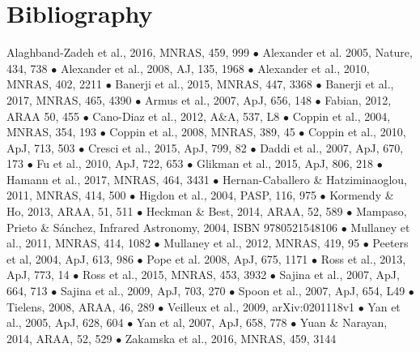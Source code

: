 \footnotesize
\section*{Bibliography}
\vspace{-8pt}
Alaghband-Zadeh et al., 2016, MNRAS, 459, 999 $\bullet$
Alexander et al. 2005, Nature, 434, 738  $\bullet$
Alexander et al., 2008, AJ, 135, 1968	 $\bullet$
Alexander et al., 2010, MNRAS, 402, 2211 $\bullet$
Banerji et al., 2015, MNRAS, 447, 3368 $\bullet$
Banerji et al., 2017, MNRAS, 465, 4390 $\bullet$
Armus et al., 2007, ApJ, 656, 148 $\bullet$
Fabian, 2012, ARAA 50, 455 $\bullet$ 
Cano-Diaz et al., 2012, A\&A, 537, L8 $\bullet$  
Coppin et al., 2004, MNRAS, 354, 193 $\bullet$
Coppin et al., 2008, MNRAS, 389, 45 $\bullet$
Coppin et al., 2010, ApJ, 713, 503 $\bullet$
Cresci et al., 2015, ApJ, 799, 82 $\bullet$
Daddi et al., 2007, ApJ, 670, 173	$\bullet$
Fu et al., 2010, ApJ, 722, 653 	$\bullet$
Glikman et al., 2015, ApJ, 806, 218 $\bullet$
Hamann et al., 2017, MNRAS, 464, 3431 $\bullet$
Hernan-Caballero \& Hatziminaoglou, 2011, MNRAS, 414, 500	$\bullet$
Higdon et al., 2004, PASP, 116, 975 $\bullet$
Kormendy \& Ho, 2013, ARAA, 51, 511 $\bullet$
Heckman \& Best, 2014, ARAA, 52, 589  $\bullet$
Mampaso, Prieto \& Sánchez, Infrared Astronomy, 2004, ISBN  9780521548106 $\bullet$
Mullaney et al., 2011, MNRAS, 414, 1082  $\bullet$
Mullaney et al., 2012, MNRAS, 419, 95 $\bullet$
Peeters et al, 2004, ApJ, 613, 986 $\bullet$
Pope et al. 2008, ApJ, 675, 1171 $\bullet$
Ross et al., 2013, ApJ, 773, 14 $\bullet$
Ross et al., 2015, MNRAS, 453, 3932 $\bullet$
Sajina et al., 2007, ApJ, 664, 713 $\bullet$
Sajina et al., 2009, ApJ, 703, 270 $\bullet$
Spoon et al., 2007, ApJ, 654, L49 $\bullet$
Tielens, 2008, ARAA, 46, 289  $\bullet$
Veilleux et al., 2009, arXiv:0201118v1 $\bullet$
Yan et al., 2005, ApJ, 628, 604 $\bullet$
Yan et al, 2007, ApJ, 658, 778 $\bullet$
Yuan \& Narayan, 2014, ARAA, 52, 529 $\bullet$
Zakamska et al., 2016, MNRAS, 459, 3144 

\normalsize
\medskip \medskip \medskip \medskip


